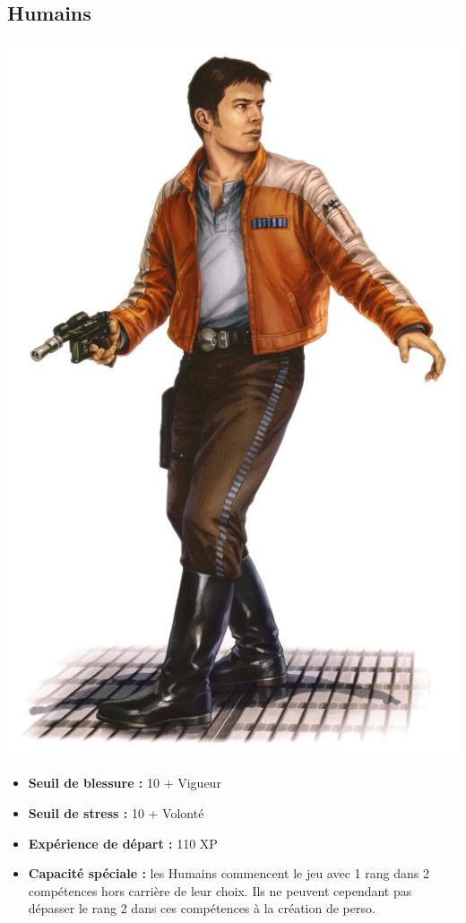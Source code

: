 \documentclass[twoside]{article}
\begin{document}
\subsection*{Humains}

\noindent\begin{minipage}{0.3\textwidth}
	\includegraphics[width=1\linewidth]{../_img/species/human}
\end{minipage}%
\hfill%
\begin{minipage}{0.7\textwidth}\raggedleft
	\begin{itemize}
		\item \textbf{Seuil de blessure :} 10 + Vigueur 
		\item \textbf{Seuil de stress :} 10 + Volonté 
		\item \textbf{Expérience de départ :} 110 XP
		\item \textbf{Capacité spéciale :} les Humains commencent le jeu avec 1 rang dans 2 compétences hors carrière de leur choix. Ils ne peuvent cependant pas dépasser le rang 2 dans ces compétences à la création de perso.
	\end{itemize}
\end{minipage}
\end{document}
